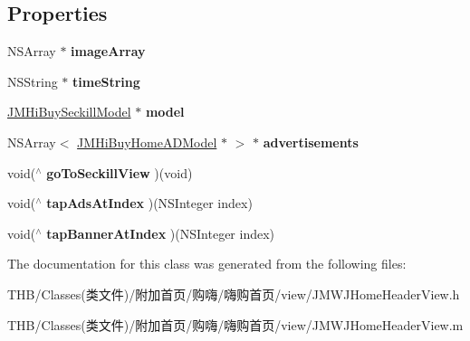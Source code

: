 \subsection*{Properties}
\begin{DoxyCompactItemize}
\item 
\mbox{\label{interface_j_m_w_j_home_header_view_a393822c1039718addf3529fc446a5d23}} 
N\+S\+Array $\ast$ {\bfseries image\+Array}
\item 
\mbox{\label{interface_j_m_w_j_home_header_view_aa782b45070686e462280fcffb1529ce7}} 
N\+S\+String $\ast$ {\bfseries time\+String}
\item 
\mbox{\label{interface_j_m_w_j_home_header_view_a4d5a5b7a503ade863d5a90579ff7dd35}} 
\mbox{\hyperlink{interface_j_m_hi_buy_seckill_model}{J\+M\+Hi\+Buy\+Seckill\+Model}} $\ast$ {\bfseries model}
\item 
\mbox{\label{interface_j_m_w_j_home_header_view_a9495e652dd9186bfc5b48ab99be1fcd7}} 
N\+S\+Array$<$ \mbox{\hyperlink{interface_j_m_hi_buy_home_a_d_model}{J\+M\+Hi\+Buy\+Home\+A\+D\+Model}} $\ast$ $>$ $\ast$ {\bfseries advertisements}
\item 
\mbox{\label{interface_j_m_w_j_home_header_view_a3f09061f3bb301c67ef82968e4d602ab}} 
void($^\wedge$ {\bfseries go\+To\+Seckill\+View} )(void)
\item 
\mbox{\label{interface_j_m_w_j_home_header_view_a1cb13b20d6797043353bccede6c1bf74}} 
void($^\wedge$ {\bfseries tap\+Ads\+At\+Index} )(N\+S\+Integer index)
\item 
\mbox{\label{interface_j_m_w_j_home_header_view_a538e80c0bbe593af2db0f2a662abad47}} 
void($^\wedge$ {\bfseries tap\+Banner\+At\+Index} )(N\+S\+Integer index)
\end{DoxyCompactItemize}


The documentation for this class was generated from the following files\+:\begin{DoxyCompactItemize}
\item 
T\+H\+B/\+Classes(类文件)/附加首页/购嗨/嗨购首页/view/J\+M\+W\+J\+Home\+Header\+View.\+h\item 
T\+H\+B/\+Classes(类文件)/附加首页/购嗨/嗨购首页/view/J\+M\+W\+J\+Home\+Header\+View.\+m\end{DoxyCompactItemize}
